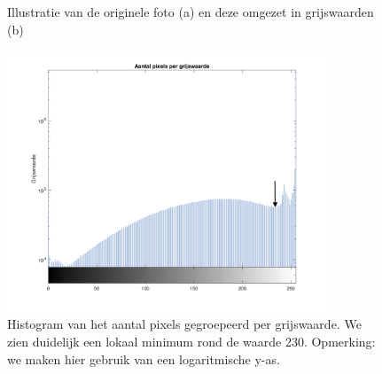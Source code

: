 \documentclass[a4paper,kulak]{kulakarticle}
\begin{document}
	\begin{figure}[H]
	\centering
	
	\caption{Illustratie van de originele foto (a) en deze omgezet in grijswaarden (b)}
	\label{figuur beste_treshold}
	\end{figure}

	\begin{figure}[H]
	\centering
	\includegraphics[width=0.85\textwidth]{GetBestTreshold_vb_aangeduid.png}
	
	\caption{Histogram van het aantal pixels gegroepeerd per grijswaarde. We zien duidelijk een lokaal minimum rond de waarde 230. Opmerking: we maken hier gebruik van een logaritmische y-as.}
	\label{figuur graf1}
	\end{figure}
\end{document}
